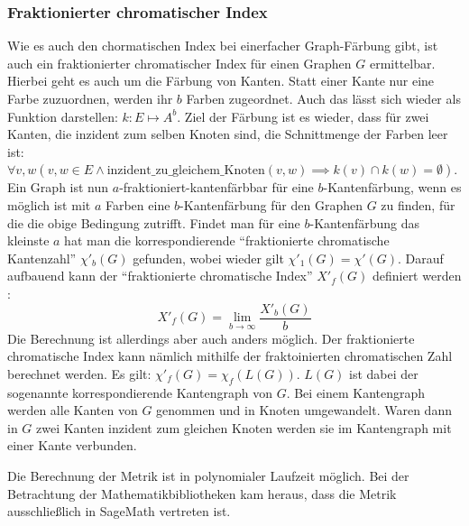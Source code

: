 \documentclass[a4paper,12pt,ngerman,chapterprefix=false,listof=totoc,bibliography=totoc]{scrreprt}
\begin{document}
\subsubsection*{Fraktionierter chromatischer Index}
{
Wie es auch den chormatischen Index bei einerfacher Graph-Färbung gibt, ist auch ein fraktionierter chromatischer Index für einen Graphen \(G\) ermittelbar. Hierbei geht es auch um die Färbung von Kanten. Statt einer Kante nur eine Farbe zuzuordnen, werden ihr \(b\) Farben zugeordnet. Auch das lässt sich wieder als Funktion darstellen: \(k:E\mapsto A^b\). Ziel der Färbung ist es wieder, dass für zwei Kanten, die inzident zum selben Knoten sind, die Schnittmenge der Farben leer ist: \(\forall v,w(v,w\in E\land \text{inzident}\_\text{zu}\_\text{gleichem}\_\text{Knoten}(v,w)\implies k(v)\cap k(w)=\emptyset)\). Ein Graph ist nun \(a\)-fraktioniert-kantenfärbbar für eine \(b\)-Kantenfärbung, wenn es möglich ist mit \(a\) Farben eine \(b\)-Kantenfärbung für den Graphen \(G\) zu finden, für die die obige Bedingung zutrifft. Findet man für eine \(b\)-Kantenfärbung das kleinste \(a\) hat man die korrespondierende "`fraktionierte chromatische Kantenzahl"' \(\chi'_b(G)\) gefunden, wobei wieder gilt \(\chi'_1(G)=\chi'(G)\). Darauf aufbauend kann der "`fraktionierte chromatische Index"' \(X'_f(G)\) definiert werden \cite{weisstein_fractional_nodate-1,scheinerman_fractional_2011}:
\[
	X'_f(G)=\lim_{b\to\infty}\frac{X'_b(G)}{b}
\]
Die Berechnung ist allerdings aber auch anders möglich. Der fraktionierte chromatische Index kann nämlich mithilfe der fraktoinierten chromatischen Zahl berechnet werden. Es gilt: \(\chi'_f(G)=\chi_f(L(G))\). \(L(G)\) ist dabei der sogenannte korrespondierende Kantengraph von \(G\). Bei einem Kantengraph werden alle Kanten von \(G\) genommen und in Knoten umgewandelt. Waren dann in \(G\) zwei Kanten inzident zum gleichen Knoten werden sie im Kantengraph mit einer Kante verbunden.

Die Berechnung der Metrik ist in polynomialer Laufzeit möglich. Bei der Betrachtung der Mathematikbibliotheken kam heraus, dass die Metrik ausschließlich in SageMath vertreten ist. \cite{sagemath_graph_2020}
}
\end{document}
